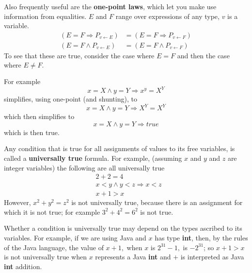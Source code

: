\documentclass[muchmore,11pt]{article}%
\begin{document}
Also frequently useful are the \textbf{one-point laws}, which let you make use
information from equalities. $E$ and $F$ range over expressions of any type,
$v$ is a variable.
\begin{align*}
\left(  E=F\Rightarrow P_{v\leftarrow E}\right)   &  =\left(  E=F\Rightarrow
P_{v\leftarrow F}\right) \\
\left(  E=F\wedge P_{v\leftarrow E}\right)   &  =\left(  E=F\wedge
P_{v\leftarrow F}\right)
\end{align*}
To see that these are true, consider the case where $E=F$ and then the case
where $E\neq F$.

For example%
\[
x=X\wedge y=Y\Rightarrow x^{y}=X^{Y}%
\]
simplifies, using one-point (and shunting), to%
\[
x=X\wedge y=Y\Rightarrow X^{Y}=X^{Y}%
\]
which then simplifies to%
\[
x=X\wedge y=Y\Rightarrow\mathit{true}%
\]
which is then true.

Any condition that is true for all assignments of values to its free
variables, is called a \textbf{universally true} formula. For example,
(assuming $x$ and $y$ and $z$ are integer variables) the following are all
universally true%
\begin{align*}
&  \left.  2+2=4\right. \\
&  \left.  x<y\wedge y<z\Rightarrow x<z\right. \\
&  \left.  x+1>x\right.
\end{align*}
However, $x^{2}+y^{2}=z^{2}$ is not universally true, because there is an
assignment for which it is not true; for example $3^{2}+4^{2}=6^{2}$ is not true.

Whether a condition is universally true may depend on the types ascribed to
its variables. For example, if we are using Java and $x$ has type
\textbf{int}, then, by the rules of the Java language, the value of $x+1,$
when $x$ is $2^{31}-1,$ is $-2^{31}$; so $x+1>x$ is not universally true when
$x$ represents a Java \textbf{int} and $+$ is interpreted as Java \textbf{int} addition.

\begin{comment}
    Note that Dafny uses short circuiting three valued logic, so it might be a good idea to change POL to
    do the same.
\end{comment}
\end{document}
